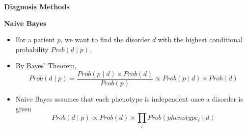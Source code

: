 \documentclass[final]{beamer} %
\begin{document}
\begin{frame}{}
\begin{columns}[T]
\begin{column}{0.3\linewidth}
{     \begin{block}{\Huge \textbf{Diagnosis Methods}}
       \begin{block}{\Large \textbf{Naive Bayes}}
         \begin{itemize}
           \Large
         \item For a patient $p$, we want to find the disorder $d$
           with the highest conditional probability $Prob(d \mid p )$.
         \item By Bayes' Theorem,
           \[Prob(d \mid p) = \frac{Prob(p \mid d) \times
             Prob(d)}{Prob(p)} \propto Prob(p \mid d) \times Prob(d)\]
         \item Naive Bayes assumes that each phenotype is independent
           once a disorder is given
           \[Prob(d \mid p) \propto Prob(d) \times \prod_i
           Prob(phenotype_i \mid d)\]
         \end{itemize}
       \end{block}


\end{block}}
\end{column}
\end{columns}
\end{frame}
\end{document}
